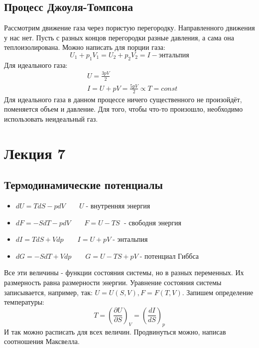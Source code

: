 \documentclass[a4paper, 12pt]{article}
\begin{document}
	\subsection{Процесс Джоуля-Томпсона}
	Рассмотрим движение газа через пористую перегородку. Направленного движения у нас нет. Пусть с разных концов перегородки разные давления, а сама она теплоизолирована. Можно написать для порции газа:
	\begin{equation*}
		U_{1} + p_{1} V_{1} = U_{2} + p_{2} V_{2} = I - \text{энтальпия}
	\end{equation*}
	Для идеального газа:
	\begin{equation*}
		\begin{aligned}
			& U = \frac{3pV}{2}                            \\
			& I = U + pV = \frac{5pV}{2} \propto T = const 
		\end{aligned}
	\end{equation*}
	Для идеального газа в данном процессе ничего существенного не произойдёт, поменяется объем и давление. Для того, чтобы что-то произошло, необходимо использовать неидеальный газ. 
	\section{Лекция 7}
	\subsection{Термодинамические потенциалы}
	\begin{itemize}
		\item $dU = TdS - pdV \qquad U \;	\text{-  внутренняя энергия}$
		\item $dF = -SdT - pdV \qquad F = U - TS \; \text{ - свободня энергия}$
		\item $dI = TdS + Vdp \qquad I = U +pV \;	\text{- энтальпия}$
		\item $dG = -SdT + Vdp \qquad G = U-TS+pV 	 \;\text{- потенциал Гиббса}$
	\end{itemize}
	Все эти величины - функции состояния системы, но в разных переменных. Их размерность равна размерности энергии. Уравнение состояния системы записывается, например, так: $U=U(S,V), F=F(T,V)$. Запишем определение температуры:
	\begin{equation*}
		T = (\frac{\partial U}{\partial S})_{V} = (\frac{dI}{dS})_{p}
	\end{equation*}
	И так можно расписать для всех величин. Продвинуться можно, написав соотношения Максвелла.
\end{document}
